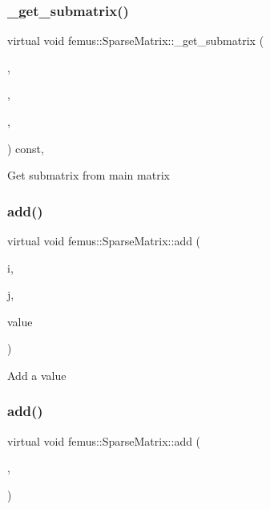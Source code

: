 \subsubsection{\texorpdfstring{\+\_\+get\+\_\+submatrix()}{\_get\_submatrix()}}
{\footnotesize\ttfamily virtual void femus\+::\+Sparse\+Matrix\+::\+\_\+get\+\_\+submatrix (\begin{DoxyParamCaption}\item[{\mbox{\hyperlink{classfemus_1_1_sparse_matrix}{Sparse\+Matrix}} \&}]{,  }\item[{const std\+::vector$<$ int $>$ \&}]{,  }\item[{const std\+::vector$<$ int $>$ \&}]{,  }\item[{const bool}]{ }\end{DoxyParamCaption}) const\hspace{0.3cm}{\ttfamily [inline]}, {\ttfamily [virtual]}}

Get submatrix from main matrix \mbox{\label{classfemus_1_1_sparse_matrix_ac6a354954020514558320a17d881d861}} 
\subsubsection{\texorpdfstring{add()}{add()}\hspace{0.1cm}{\footnotesize\ttfamily [1/2]}}
{\footnotesize\ttfamily virtual void femus\+::\+Sparse\+Matrix\+::add (\begin{DoxyParamCaption}\item[{const int}]{i,  }\item[{const int}]{j,  }\item[{const double}]{value }\end{DoxyParamCaption})\hspace{0.3cm}{\ttfamily [pure virtual]}}

Add a value \mbox{\label{classfemus_1_1_sparse_matrix_aebfeb2086e9673a430003a33c4e7c2c0}} 
\subsubsection{\texorpdfstring{add()}{add()}\hspace{0.1cm}{\footnotesize\ttfamily [2/2]}}
{\footnotesize\ttfamily virtual void femus\+::\+Sparse\+Matrix\+::add (\begin{DoxyParamCaption}\item[{const double}]{,  }\item[{\mbox{\hyperlink{classfemus_1_1_sparse_matrix}{Sparse\+Matrix}} \&}]{ }\end{DoxyParamCaption})\hspace{0.3cm}{\ttfamily [pure virtual]}}

